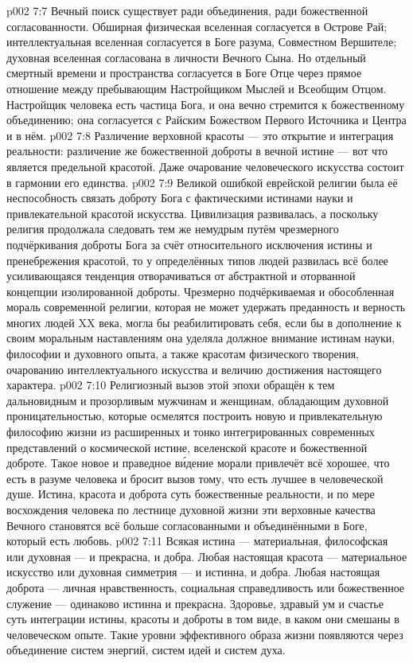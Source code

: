 \vs p002 7:7 \pc Вечный поиск существует ради объединения, ради божественной согласованности. Обширная физическая вселенная согласуется в Острове Рай; интеллектуальная вселенная согласуется в Боге разума, Совместном Вершителе; духовная вселенная согласована в личности Вечного Сына. Но отдельный смертный времени и пространства согласуется в Боге Отце через прямое отношение между пребывающим Настройщиком Мыслей и Всеобщим Отцом. Настройщик человека есть частица Бога, и она вечно стремится к божественному объединению; она согласуется с Райским Божеством Первого Источника и Центра и в нём.
\vs p002 7:8 \pc Различение верховной красоты --- это открытие и интеграция реальности: различение же божественной доброты в вечной истине --- вот что является предельной красотой. Даже очарование человеческого искусства состоит в гармонии его единства.
\vs p002 7:9 Великой ошибкой еврейской религии была её неспособность связать доброту Бога с фактическими истинами науки и привлекательной красотой искусства. Цивилизация развивалась, а поскольку религия продолжала следовать тем же немудрым путём чрезмерного подчёркивания доброты Бога за счёт относительного исключения истины и пренебрежения красотой, то у определённых типов людей развилась всё более усиливающаяся тенденция отворачиваться от абстрактной и оторванной концепции изолированной доброты. Чрезмерно подчёркиваемая и обособленная мораль современной религии, которая не может удержать преданность и верность многих людей XX века, могла бы реабилитировать себя, если бы в дополнение к своим моральным наставлениям она уделяла должное внимание истинам науки, философии и духовного опыта, а также красотам физического творения, очарованию интеллектуального искусства и величию достижения настоящего характера.
\vs p002 7:10 Религиозный вызов этой эпохи обращён к тем дальновидным и прозорливым мужчинам и женщинам, обладающим духовной проницательностью, которые осмелятся построить новую и привлекательную философию жизни из расширенных и тонко интегрированных современных представлений о космической истине, вселенской красоте и божественной доброте. Такое новое и праведное в\'идение морали привлечёт всё хорошее, что есть в разуме человека и бросит вызов тому, что есть лучшее в человеческой душе. Истина, красота и доброта суть божественные реальности, и по мере восхождения человека по лестнице духовной жизни эти верховные качества Вечного становятся всё больше согласованными и объединёнными в Боге, который есть любовь.
\vs p002 7:11 \pc Всякая истина --- материальная, философская или духовная --- и прекрасна, и добра. Любая настоящая красота --- материальное искусство или духовная симметрия --- и истинна, и добра. Любая настоящая доброта --- личная нравственность, социальная справедливость или божественное служение --- одинаково истинна и прекрасна. Здоровье, здравый ум и счастье суть интеграции истины, красоты и доброты в том виде, в каком они смешаны в человеческом опыте. Такие уровни эффективного образа жизни появляются через объединение систем энергий, систем идей и систем духа.
